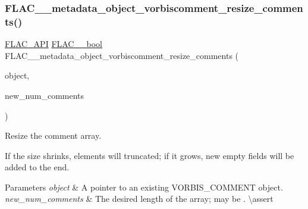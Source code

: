 \subsubsection{\texorpdfstring{FLAC\_\_metadata\_object\_vorbiscomment\_resize\_comments()}{FLAC\_\_metadata\_object\_vorbiscomment\_resize\_comments()}}
{\footnotesize\ttfamily \mbox{\hyperlink{group__flac__export_ga56ca07df8a23310707732b1c0007d6f5}{F\+L\+A\+C\+\_\+\+A\+PI}} \mbox{\hyperlink{ordinals_8h_a95103469f1cbd78b8cf250194985b34e}{F\+L\+A\+C\+\_\+\+\_\+bool}} F\+L\+A\+C\+\_\+\+\_\+metadata\+\_\+object\+\_\+vorbiscomment\+\_\+resize\+\_\+comments (\begin{DoxyParamCaption}\item[{\mbox{\hyperlink{struct_f_l_a_c_____stream_metadata}{F\+L\+A\+C\+\_\+\+\_\+\+Stream\+Metadata}} $\ast$}]{object,  }\item[{unsigned}]{new\+\_\+num\+\_\+comments }\end{DoxyParamCaption})}

Resize the comment array.

If the size shrinks, elements will truncated; if it grows, new empty fields will be added to the end.


\begin{DoxyParams}{Parameters}
{\em object} & A pointer to an existing V\+O\+R\+B\+I\+S\+\_\+\+C\+O\+M\+M\+E\+NT object. \\
\hline
{\em new\+\_\+num\+\_\+comments} & The desired length of the array; may be {}. \textbackslash{}assert 
\begin{DoxyCode}{1}
\end{DoxyCode}
 
\begin{DoxyCode}{1}
\end{DoxyCode}
 
\begin{DoxyCode}{1}
\end{DoxyCode}
 \\
\hline
\end{DoxyParams}

